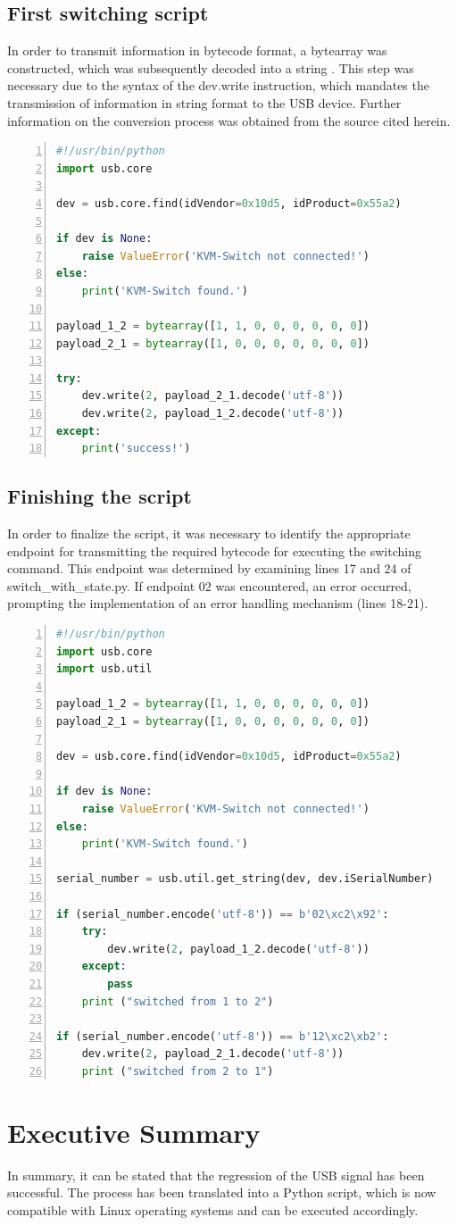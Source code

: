 \subsection{First switching script}
In order to transmit information in bytecode format, a bytearray \cite{Programiz/python-programming} was constructed, which was subsequently decoded into a string \cite{python_docs} \cite{Stackoverflow}. This step was necessary due to the syntax of the dev.write instruction, which mandates the transmission of information in string format to the USB device. Further information on the conversion process was obtained from the source cited herein.

\begin{lstlisting}[language=Python,numbers=left, basicstyle=\small]
#!/usr/bin/python
import usb.core

dev = usb.core.find(idVendor=0x10d5, idProduct=0x55a2)

if dev is None:
    raise ValueError('KVM-Switch not connected!')
else:
    print('KVM-Switch found.')

payload_1_2 = bytearray([1, 1, 0, 0, 0, 0, 0, 0])
payload_2_1 = bytearray([1, 0, 0, 0, 0, 0, 0, 0])

try:
    dev.write(2, payload_2_1.decode('utf-8'))
    dev.write(2, payload_1_2.decode('utf-8'))
except:
    print('success!')
\end{lstlisting}

\subsection{Finishing the script}
In order to finalize the script, it was necessary to identify the appropriate endpoint for transmitting the required bytecode for executing the switching command. This endpoint was determined by examining lines 17 and 24 of switch\_with\_state.py. If endpoint 02 was encountered, an error occurred, prompting the implementation of an error handling mechanism (lines 18-21).
\newpage
\begin{lstlisting}[language=Python,numbers=left, basicstyle=\small]
#!/usr/bin/python
import usb.core
import usb.util

payload_1_2 = bytearray([1, 1, 0, 0, 0, 0, 0, 0])
payload_2_1 = bytearray([1, 0, 0, 0, 0, 0, 0, 0])

dev = usb.core.find(idVendor=0x10d5, idProduct=0x55a2)

if dev is None:
    raise ValueError('KVM-Switch not connected!')
else:
    print('KVM-Switch found.')

serial_number = usb.util.get_string(dev, dev.iSerialNumber)

if (serial_number.encode('utf-8')) == b'02\xc2\x92':
    try:
        dev.write(2, payload_1_2.decode('utf-8'))
    except:
        pass
    print ("switched from 1 to 2")

if (serial_number.encode('utf-8')) == b'12\xc2\xb2':
    dev.write(2, payload_2_1.decode('utf-8'))
    print ("switched from 2 to 1")
\end{lstlisting}

\section{Executive Summary}
In summary, it can be stated that the regression of the USB signal has been successful. The process has been translated into a Python script, which is now compatible with Linux operating systems and can be executed accordingly.
